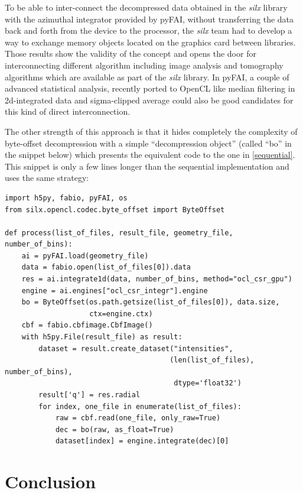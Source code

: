 \documentclass[preprint]{iucr}              %
\begin{document}
To be able to inter-connect the decompressed data obtained in the \textit{silx}
library with the azimuthal integrator provided by pyFAI, without transferring the data
back and forth from the device to the processor, the \textit{silx} team had to develop a
way to exchange memory objects located on the graphics card between libraries. 
Those results show the validity of the concept and opens the door for
interconnecting different algorithm including image analysis and
tomography algorithms which are available as part of the \textit{silx} library.
In pyFAI, a couple of advanced statistical analysis, recently ported to
OpenCL like median filtering in 2d-integrated data and sigma-clipped
average could also be good candidates for this kind of direct interconnection.

The other strength of this approach is that it hides completely the
complexity of byte-offset decompression with a simple ``decompression
object'' (called ``bo'' in the snippet below) which presents the equivalent
code to the one in \ref{sequential}.
This snippet is only a few lines longer than the sequential implementation and
uses the same strategy:

\begin{minipage}{\linewidth}
\begin{verbatim}
import h5py, fabio, pyFAI, os
from silx.opencl.codec.byte_offset import ByteOffset

def process(list_of_files, result_file, geometry_file, number_of_bins):
    ai = pyFAI.load(geometry_file)
    data = fabio.open(list_of_files[0]).data
    res = ai.integrate1d(data, number_of_bins, method="ocl_csr_gpu")
    engine = ai.engines["ocl_csr_integr"].engine
    bo = ByteOffset(os.path.getsize(list_of_files[0]), data.size,
                    ctx=engine.ctx) 
    cbf = fabio.cbfimage.CbfImage()
    with h5py.File(result_file) as result:
        dataset = result.create_dataset("intensities", 
                                       (len(list_of_files), number_of_bins),
                                        dtype='float32') 
        result['q'] = res.radial 
        for index, one_file in enumerate(list_of_files):
            raw = cbf.read(one_file, only_raw=True)
            dec = bo(raw, as_float=True)
            dataset[index] = engine.integrate(dec)[0]
\end{verbatim}
\end{minipage}

\section{Conclusion}
\end{document}
